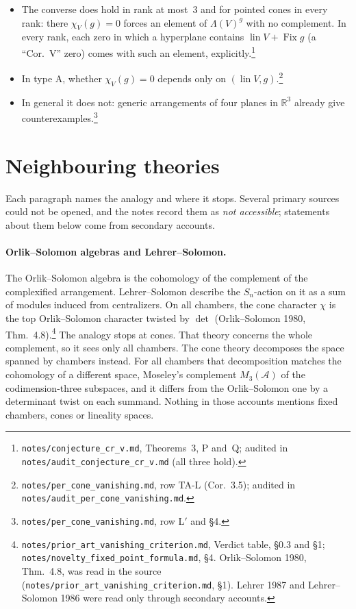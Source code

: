 \documentclass[11pt]{article}
\theoremstyle{definition}
\theoremstyle{remark}
\newcommand{\Fix}{\operatorname{Fix}}
\newcommand{\lin}{\operatorname{lin}}
\newcommand{\src}[1]{\nolinkurl{#1}}
\newcommand{\tagbox}[1]{\leavevmode\marginpar{\raggedright\fbox{\parbox{0.66in}{\centering\scriptsize\sffamily #1}}}}
\newcommand{\PROVEN}{\tagbox{PROVEN\\AUDITED}}
\newcommand{\COMPUTED}{\tagbox{COMPUTED}}
\begin{document}
\begin{itemize}
{  1981), not for general posets
  (\src{notes/prior_art_cr_v_type_a.md}).}
  Moreover, every such zero has an explicit, uniform witness with no
  complement, given by one of two formulas.\footnote{%
  \src{notes/observation_cc.md}, Theorem~CC and Cor.~U; independently
  audited in \src{notes/audit_observation_cc.md} (it holds).}
\item \PROVEN The converse does hold in rank at most~$3$ and for pointed
  cones in every rank: there $\chi_V(g)=0$ forces an element of
  $\Lambda(V)^g$ with no complement. In every rank, each zero in which a
  hyperplane contains $\lin V+\Fix g$ (a ``Cor.~V'' zero) comes with such an
  element, explicitly.\footnote{\src{notes/conjecture_cr_v.md}, Theorems~3, P
  and~Q; audited in \src{notes/audit_conjecture_cr_v.md} (all three
  hold).}
\item \PROVEN In type A, whether $\chi_V(g)=0$ depends only on
  $(\lin V,g)$.\footnote{\src{notes/per_cone_vanishing.md}, row TA-L
  (Cor.~3.5); audited in \src{notes/audit_per_cone_vanishing.md}.}
\item \COMPUTED In general it does not: generic arrangements of four planes
  in $\mathbb R^3$ already give counterexamples.\footnote{%
  \src{notes/per_cone_vanishing.md}, row L$'$ and \S4.}
\end{itemize}

\section{Neighbouring theories}

Each paragraph names the analogy and where it stops. Several primary sources
could not be opened, and the notes record them as \emph{not accessible};
statements about them below come from secondary accounts.

\paragraph{Orlik--Solomon algebras and Lehrer--Solomon.} The Orlik--Solomon
algebra is the cohomology of the complement of the complexified arrangement.
Lehrer--Solomon describe the $S_n$-action on it as a sum of modules induced
from centralizers. On all chambers, the cone character $\chi$ is the top
Orlik--Solomon character twisted by $\det$ (Orlik--Solomon 1980,
Thm.~4.8).\footnote{\src{notes/prior_art_vanishing_criterion.md}, Verdict
table, \S0.3 and \S1; \src{notes/novelty_fixed_point_formula.md}, \S4.
Orlik--Solomon 1980, Thm.~4.8, was read in the source
(\src{notes/prior_art_vanishing_criterion.md}, \S1). Lehrer 1987 and
Lehrer--Solomon 1986 were read only through secondary accounts.} The
analogy stops at cones. That theory concerns the whole complement, so it
sees only all chambers. The cone theory decomposes the space spanned by
chambers instead. For all chambers that decomposition matches the cohomology
of a different space, Moseley's complement $M_3(\mathcal A)$ of the
codimension-three subspaces, and it differs from the Orlik--Solomon one by a
determinant twist on each summand. Nothing in those
accounts mentions fixed chambers, cones or lineality spaces.
\end{document}

